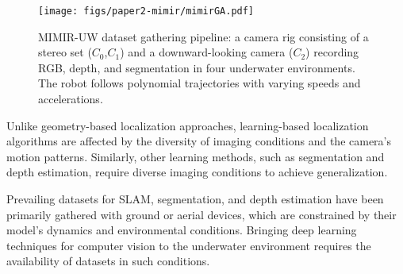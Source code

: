 

\begin{figure}[!htp]
    \centering
    \texttt{[image: figs/paper2-mimir/mimirGA.pdf]}
    \caption[MIMIR-UW dataset gathering pipeline]{MIMIR-UW dataset gathering pipeline: a camera rig consisting of a stereo set ($C_0$,$C_1$) and a downward-looking camera ($C_2$) recording RGB, depth, and segmentation in four underwater environments. The robot follows polynomial trajectories with varying speeds and accelerations.}
    \label{mimir:fig:GA}
\end{figure}

Unlike geometry-based localization approaches, learning-based localization algorithms are affected by the diversity of imaging conditions and the camera's motion patterns. Similarly, other learning methods, such as segmentation and depth estimation, require diverse imaging conditions to achieve generalization.

Prevailing datasets for \ac{SLAM}, segmentation, and depth estimation have been primarily gathered with ground or aerial devices, which are constrained by their model's dynamics and environmental conditions.
Bringing deep learning techniques for computer vision to the underwater environment requires the availability of datasets in such conditions. 

